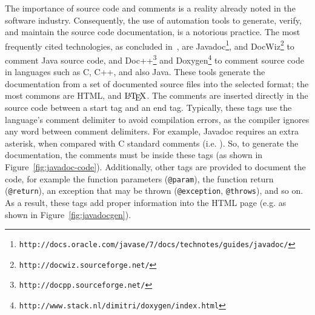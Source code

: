 The importance of source code and comments is a reality already noted in the software industry. Consequently, the use of automation tools to generate, verify, and maintain the source code documentation, is a notorious practice. The most frequently cited technologies, as concluded in~\citep{forward2002relevance}, are Javadoc\footnote{\texttt{http://docs.oracle.com/javase/7/docs/technotes/guides/javadoc/}}, and DocWiz\footnote{\texttt{http://docwiz.sourceforge.net/}} to comment Java source code, and Doc++\footnote{\texttt{http://docpp.sourceforge.net/}} and Doxygen\footnote{\texttt{http://www.stack.nl/dimitri/doxygen/index.html}} to comment source code in languages such as C, C++, and also Java. These tools generate the documentation from a set of documented source files into the selected format; the most commons are HTML, and $\mbox{\LaTeX}$. The comments are inserted directly in the source code between a start tag and an end tag. Typically, these tags use the language's comment delimiter to avoid compilation errors, as the compiler ignores any word between comment delimiters. For example, Javadoc requires an extra asterisk, when compared with C standard comments (i.e. \pythoninline{/* */}). So, to generate the documentation, the comments must be inside these tags (as shown in Figure~\ref{fig:javadoc-code}). Additionally, other tags are provided to document the code, for example the function parameters (\texttt{@param}), the function return (\texttt{@return}), an exception that may be thrown (\texttt{@exception}, \texttt{@throws}), and so on. As a result, these tags add proper information into the HTML page (e.g. as shown in Figure~\ref{fig:javadocgen}).

